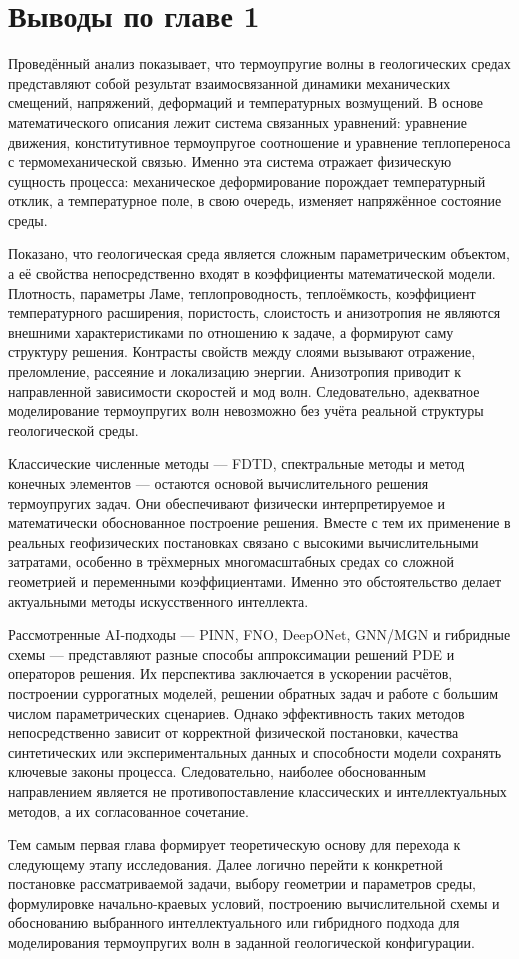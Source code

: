 \section{Выводы по главе 1}

Проведённый анализ показывает, что термоупругие волны в геологических средах представляют собой результат взаимосвязанной динамики механических смещений, напряжений, деформаций и температурных возмущений. В основе математического описания лежит система связанных уравнений: уравнение движения, конститутивное термоупругое соотношение и уравнение теплопереноса с термомеханической связью. Именно эта система отражает физическую сущность процесса: механическое деформирование порождает температурный отклик, а температурное поле, в свою очередь, изменяет напряжённое состояние среды.

Показано, что геологическая среда является сложным параметрическим объектом, а её свойства непосредственно входят в коэффициенты математической модели. Плотность, параметры Ламе, теплопроводность, теплоёмкость, коэффициент температурного расширения, пористость, слоистость и анизотропия не являются внешними характеристиками по отношению к задаче, а формируют саму структуру решения. Контрасты свойств между слоями вызывают отражение, преломление, рассеяние и локализацию энергии. Анизотропия приводит к направленной зависимости скоростей и мод волн. Следовательно, адекватное моделирование термоупругих волн невозможно без учёта реальной структуры геологической среды.

Классические численные методы --- FDTD, спектральные методы и метод конечных элементов --- остаются основой вычислительного решения термоупругих задач. Они обеспечивают физически интерпретируемое и математически обоснованное построение решения. Вместе с тем их применение в реальных геофизических постановках связано с высокими вычислительными затратами, особенно в трёхмерных многомасштабных средах со сложной геометрией и переменными коэффициентами. Именно это обстоятельство делает актуальными методы искусственного интеллекта.

Рассмотренные AI-подходы --- PINN, FNO, DeepONet, GNN/MGN и гибридные схемы --- представляют разные способы аппроксимации решений PDE и операторов решения. Их перспектива заключается в ускорении расчётов, построении суррогатных моделей, решении обратных задач и работе с большим числом параметрических сценариев. Однако эффективность таких методов непосредственно зависит от корректной физической постановки, качества синтетических или экспериментальных данных и способности модели сохранять ключевые законы процесса. Следовательно, наиболее обоснованным направлением является не противопоставление классических и интеллектуальных методов, а их согласованное сочетание.

Тем самым первая глава формирует теоретическую основу для перехода к следующему этапу исследования. Далее логично перейти к конкретной постановке рассматриваемой задачи, выбору геометрии и параметров среды, формулировке начально-краевых условий, построению вычислительной схемы и обоснованию выбранного интеллектуального или гибридного подхода для моделирования термоупругих волн в заданной геологической конфигурации.